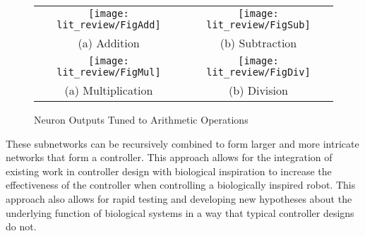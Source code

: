 \begin{figure}
\centering
\begin{tabular}{cc}
\texttt{[image: lit\_review/FigAdd]} &
\texttt{[image: lit\_review/FigSub]} \\
(a) Addition & (b) Subtraction \\
\texttt{[image: lit\_review/FigMul]} &
\texttt{[image: lit\_review/FigDiv]} \\
(a) Multiplication & (b) Division \\
\end{tabular}
\caption{Neuron Outputs Tuned to Arithmetic Operations}
\label{fig:MathOutputs}
\end{figure}

These subnetworks can be recursively combined to form larger and more intricate
networks that form a controller. This approach allows for the integration of
existing work in controller design with biological inspiration to increase the
effectiveness of the controller when controlling a biologically inspired robot.
This approach also allows for rapid testing and developing new hypotheses about the underlying function of biological systems in a way that typical controller designs do not.
